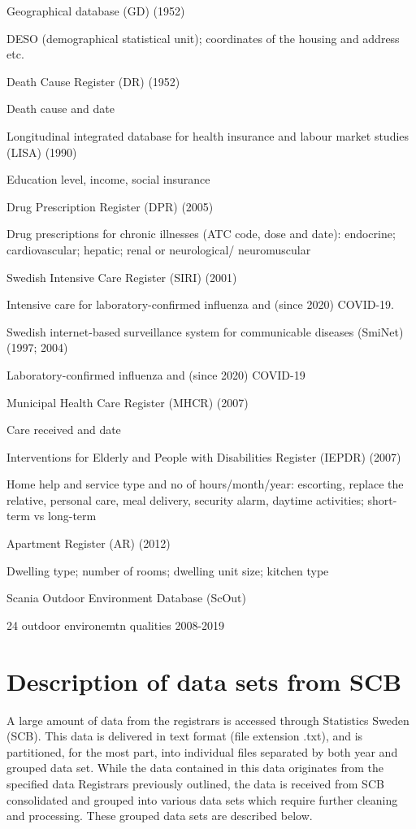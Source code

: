 \documentclass[
]{book}
\begin{document}
Geographical database (GD) (1952)

DESO (demographical statistical unit); coordinates of the housing and address etc.

Death Cause Register (DR) (1952)

Death cause and date

Longitudinal integrated database for health
insurance and labour market studies (LISA) (1990)

Education level, income, social insurance

Drug Prescription Register (DPR) (2005)

Drug prescriptions for chronic illnesses (ATC code, dose and date): endocrine; cardiovascular; hepatic; renal or neurological/ neuromuscular

Swedish Intensive Care Register (SIRI) (2001)

Intensive care for laboratory-confirmed influenza and (since 2020) COVID-19.

Swedish internet-based surveillance system for communicable diseases (SmiNet) (1997; 2004)

Laboratory-confirmed influenza and (since 2020) COVID-19

Municipal Health Care Register (MHCR) (2007)

Care received and date

Interventions for Elderly and People with Disabilities Register (IEPDR) (2007)

Home help and service type and no of hours/month/year: escorting, replace the relative, personal care, meal delivery, security alarm, daytime activities; short-term vs long-term

Apartment Register (AR) (2012)

Dwelling type; number of rooms; dwelling unit size; kitchen type

Scania Outdoor Environment Database (ScOut)

24 outdoor environemtn qualities 2008-2019

\hypertarget{description-of-data-sets-from-scb}{%
\section{Description of data sets from SCB}\label{description-of-data-sets-from-scb}}

A large amount of data from the registrars is accessed through Statistics Sweden (SCB). This data is delivered in text format (file extension .txt), and is partitioned, for the most part, into individual files separated by both year and grouped data set. While the data contained in this data originates from the specified data Registrars previously outlined, the data is received from SCB consolidated and grouped into various data sets which require further cleaning and processing. These grouped data sets are described below.
\end{document}
